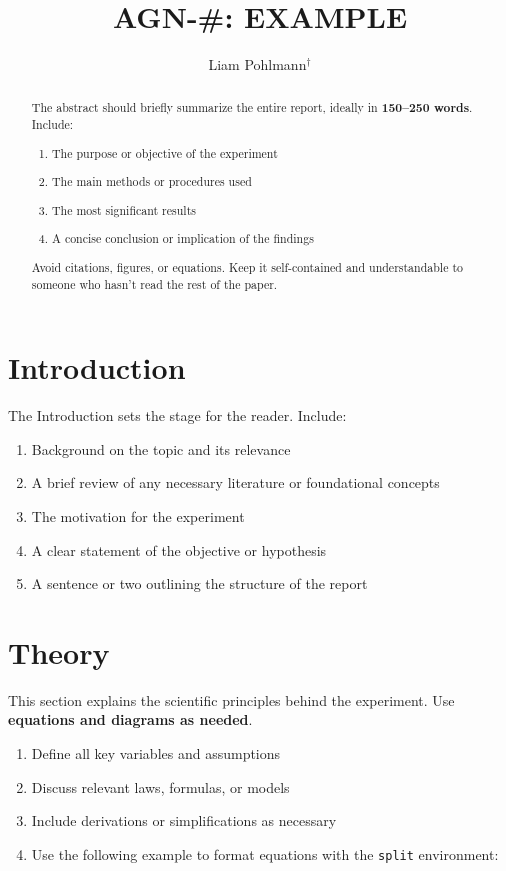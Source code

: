 \documentclass{413L}
\title{\Large AGN-\#: EXAMPLE}\vspace{0.5cm}
\author{Liam Pohlmann$^{\dagger}$}
\institute{
    $^{\dagger}$Undergraduate, Department of Nuclear Engineering, University of New Mexico, Albuquerque, NM
}
\begin{document}
    \singlespace


    \begin{abstract}
    The abstract should briefly summarize the entire report, ideally in \textbf{150–250 words}. Include:
    \begin{enumerate}
        \item The purpose or objective of the experiment
        \item The main methods or procedures used
        \item The most significant results
        \item A concise conclusion or implication of the findings
    \end{enumerate}
    Avoid citations, figures, or equations. Keep it self-contained and understandable to someone who hasn’t read the rest of the paper.
\end{abstract}

\section{Introduction}
The Introduction sets the stage for the reader. Include:
\begin{enumerate}
    \item Background on the topic and its relevance
    \item A brief review of any necessary literature or foundational concepts
    \item The motivation for the experiment
    \item A clear statement of the objective or hypothesis
    \item A sentence or two outlining the structure of the report
\end{enumerate}

\section{Theory}
This section explains the scientific principles behind the experiment. Use \textbf{equations and diagrams as needed}.

\begin{enumerate}
    \item Define all key variables and assumptions
    \item Discuss relevant laws, formulas, or models
    \item Include derivations or simplifications as necessary
    \item Use the following example to format equations with the \texttt{split} environment:
\end{enumerate}
\end{document}
